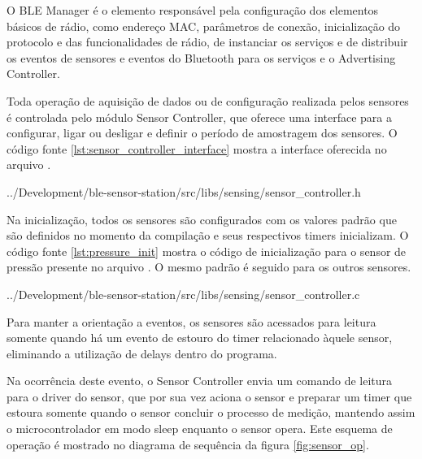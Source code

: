 O BLE Manager é o elemento responsável pela configuração dos elementos básicos
de rádio, como endereço MAC, parâmetros de conexão, inicialização do protocolo e
das funcionalidades de rádio, de instanciar os serviços e de distribuir os
eventos de sensores e eventos do Bluetooth para os serviços e o Advertising
Controller.


Toda operação de aquisição de dados ou de configuração realizada pelos sensores
é controlada pelo módulo Sensor Controller, que oferece uma interface para a
configurar, ligar ou desligar e definir o período de amostragem dos sensores. O
código fonte \ref{lst:sensor_controller_interface} mostra a interface oferecida
no arquivo .
 
\begin{minipage}{0.95\linewidth} 

{../Development/ble-sensor-station/src/libs/sensing/sensor_controller.h}
\end{minipage}

Na inicialização, todos os sensores são configurados com os valores padrão que
são definidos no momento da compilação e seus respectivos timers inicializam. O
código fonte \ref{lst:pressure_init} mostra o código de inicialização para o
sensor de pressão presente no arquivo . O mesmo
padrão é seguido para os outros sensores.

\begin{minipage}{0.95\linewidth} 
 
{../Development/ble-sensor-station/src/libs/sensing/sensor_controller.c}
\end{minipage}

Para manter a orientação a eventos, os sensores são acessados para
leitura somente quando há um evento de estouro do timer relacionado àquele
sensor, eliminando a utilização de delays dentro do programa. 

Na ocorrência deste evento, o Sensor Controller envia um comando de
leitura para o driver do sensor, que por sua vez aciona o sensor e
preparar um timer que estoura somente quando o sensor concluir o processo
de medição, mantendo assim o microcontrolador em modo sleep enquanto o sensor
opera. Este esquema de operação é mostrado no diagrama de sequência da figura
\ref{fig:sensor_op}.

